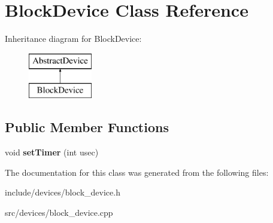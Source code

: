 \hypertarget{classBlockDevice}{\section{\-Block\-Device \-Class \-Reference}
\label{db/d6d/classBlockDevice}
}
\-Inheritance diagram for \-Block\-Device\-:\begin{figure}[H]
\begin{center}
\leavevmode
\includegraphics[height=2.000000cm]{db/d6d/classBlockDevice}
\end{center}
\end{figure}
\subsection*{\-Public \-Member \-Functions}
\begin{DoxyCompactItemize}
\item 
\hypertarget{classBlockDevice_a7ff2350ac492e4a73a4b59f9a6bbe629}{void {\bfseries set\-Timer} (int usec)}\label{db/d6d/classBlockDevice_a7ff2350ac492e4a73a4b59f9a6bbe629}

\end{DoxyCompactItemize}


\-The documentation for this class was generated from the following files\-:\begin{DoxyCompactItemize}
\item 
include/devices/block\-\_\-device.\-h\item 
src/devices/block\-\_\-device.\-cpp\end{DoxyCompactItemize}
